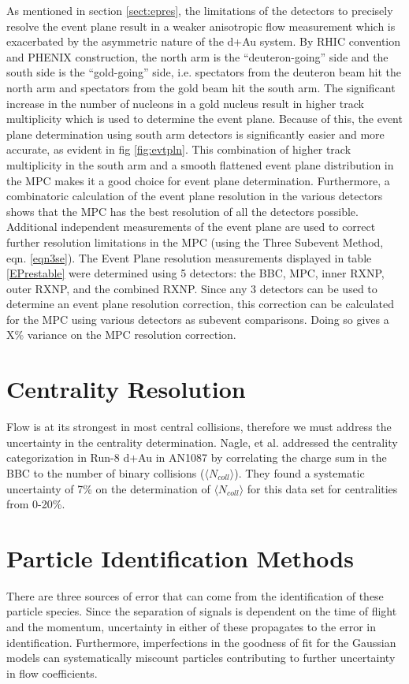 As mentioned in section \ref{sect:epres}, the limitations of the detectors to precisely resolve the event plane result in a weaker anisotropic flow measurement which is exacerbated by the asymmetric nature of the d+Au system. By RHIC convention and PHENIX construction, the north arm is the ``deuteron-going'' side and the south side is the ``gold-going'' side, i.e. spectators from the deuteron beam hit the north arm and spectators from the gold beam hit the south arm. The significant increase in the number of nucleons in a gold nucleus result in higher track multiplicity which is used to determine the event plane. Because of this, the event plane determination using south arm detectors is significantly easier and more accurate, as evident in fig \ref{fig:evtpln}. This combination of higher track multiplicity in the south arm and a smooth flattened event plane distribution in the MPC makes it a good choice for event plane determination. Furthermore, a combinatoric calculation of the event plane resolution in the various detectors shows that the MPC has the best resolution of all the detectors possible. Additional independent measurements of the event plane are used to correct further resolution limitations in the MPC (using the Three Subevent Method, eqn. \ref{eqn3se}). The Event Plane resolution measurements displayed in table \ref{EPrestable} were determined using 5 detectors: the BBC, MPC, inner RXNP, outer RXNP, and the combined RXNP. Since any 3 detectors can be used to determine an event plane resolution correction, this correction can be calculated for the MPC using various detectors as subevent comparisons. Doing so gives a X\% variance on the MPC resolution correction.

\section{Centrality Resolution}
\label{sectcenterr}
Flow is at its strongest in most central collisions, therefore we must address the uncertainty in the centrality determination. Nagle, et al. addressed the centrality categorization in Run-8 d+Au in AN1087\citep{phenixcentrality} by correlating the charge sum in the BBC to the number of binary collisions ($\langle N_{coll} \rangle$). They found a systematic uncertainty of 7\% on the determination of $\langle N_{coll} \rangle$ for this data set for centralities from 0-20\%.

\section{Particle Identification Methods}
\label{sectpiderr}
There are three sources of error that can come from the identification of these particle species. Since the separation of signals is dependent on the time of flight and the momentum, uncertainty in either of these propagates to the error in identification. Furthermore, imperfections in the goodness of fit for the Gaussian models can systematically miscount particles contributing to further uncertainty in flow coefficients.

